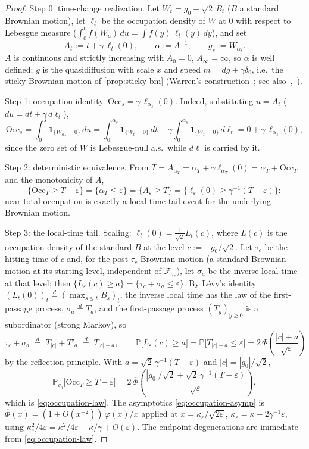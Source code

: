 \documentclass[reqno,final,11pt]{amsart}
\theoremstyle{plain}
\theoremstyle{definition}
\theoremstyle{remark}
\newcommand{\Prob}{\mathbb P}
\begin{document}
\begin{proof}
Step 0: time-change realization. Let $W_t=g_0+\sqrt2\,B_t$ ($B$ a
standard Brownian motion), let $\ell_t$ be the occupation density of $W$ at $0$
with respect to Lebesgue measure
($\int_0^tf(W_u)\,du=\int f(y)\,\ell_t(y)\,dy$), and set
\[
  A_t:=t+\gamma\,\ell_t(0),\qquad \alpha:=A^{-1},\qquad g_s:=W_{\alpha_s}.
\]
$A$ is continuous and strictly increasing with $A_0=0$, $A_\infty=\infty$, so
$\alpha$ is well defined; $g$ is the quasidiffusion with scale $x$ and speed
$m=dg+\gamma\delta_0$, i.e.\ the sticky Brownian motion of
\cref{prop:sticky-bm} (Warren's construction~\citep{Warren97};
see also~\citep[\S4.11]{ItoMcKean},~\citep{EngelbertPeskir}).

Step 1: occupation identity. $\mathrm{Occ}_s=\gamma\,\ell_{\alpha_s}(0)$.
Indeed, substituting $u=A_t$ ($du=dt+\gamma\,d\ell_t$),
\[
  \mathrm{Occ}_s=\int_0^s\mathbf 1_{\{W_{\alpha_u}=0\}}\,du
  =\int_0^{\alpha_s}\mathbf 1_{\{W_t=0\}}\,dt
  +\gamma\int_0^{\alpha_s}\mathbf 1_{\{W_t=0\}}\,d\ell_t
  =0+\gamma\,\ell_{\alpha_s}(0),
\]
since the zero set of $W$ is Lebesgue-null a.s.\ while $d\ell$ is carried by it.

Step 2: deterministic equivalence. From $T=A_{\alpha_T}=
\alpha_T+\gamma\ell_{\alpha_T}(0)=\alpha_T+\mathrm{Occ}_T$ and the monotonicity
of $A$,
\[
  \{\mathrm{Occ}_T\ge T-\varepsilon\}
  =\{\alpha_T\le\varepsilon\}
  =\{A_\varepsilon\ge T\}
  =\bigl\{\ell_\varepsilon(0)\ge\gamma^{-1}(T-\varepsilon)\bigr\}:
\]
near-total occupation is exactly a local-time tail event for the
underlying Brownian motion.

Step 3: the local-time tail. Scaling: $\ell_t(0)=
\tfrac1{\sqrt2}L_t(c)$, where $L(c)$ is the occupation density of the standard
$B$ at the level $c:=-g_0/\sqrt2$. Let $\tau_c$ be the hitting time of $c$ and,
for the post-$\tau_c$ Brownian motion (a standard Brownian motion at its
starting level, independent of $\mathcal F_{\tau_c}$), let $\sigma_a$ be the
inverse local time at that level; then
$\{L_\varepsilon(c)\ge a\}=\{\tau_c+\sigma_a\le\varepsilon\}$. By L\'evy's
identity $(L_t(0))_{t}\overset{d}{=}(\max_{s\le t}B_s)_t$, the inverse local
time has the law of the first-passage process, $\sigma_a\overset d=T_a$, and
the first-passage process $(T_y)_{y\ge0}$ is a subordinator (strong Markov),
so
\[
  \tau_c+\sigma_a\;\overset d=\;T_{|c|}+T'_a\;\overset d=\;T_{|c|+a},
  \qquad
  \Prob\bigl[L_\varepsilon(c)\ge a\bigr]
  =\Prob\bigl[T_{|c|+a}\le\varepsilon\bigr]
  =2\,\overline\Phi\!\left(\frac{|c|+a}{\sqrt\varepsilon}\right)
\]
by the reflection principle. With $a=\sqrt2\,\gamma^{-1}(T-\varepsilon)$ and
$|c|=|g_0|/\sqrt2$,
\[
  \Prob_{g_0}\bigl[\mathrm{Occ}_T\ge T-\varepsilon\bigr]
  =2\,\overline\Phi\!\left(\frac{|g_0|/\sqrt2+\sqrt2\,\gamma^{-1}(T-\varepsilon)}
  {\sqrt\varepsilon}\right),
\]
which is \eqref{eq:occupation-law}. The asymptotics
\eqref{eq:occupation-asymp} is $\overline\Phi(x)=(1+O(x^{-2}))\,\varphi(x)/x$
applied at $x=\kappa_\varepsilon/\sqrt{2\varepsilon}$,
$\kappa_\varepsilon=\kappa-2\gamma^{-1}\varepsilon$, using
$\kappa_\varepsilon^2/4\varepsilon=\kappa^2/4\varepsilon-\kappa/\gamma
+O(\varepsilon)$. The endpoint degenerations are immediate from
\eqref{eq:occupation-law}.
\end{proof}
\end{document}
